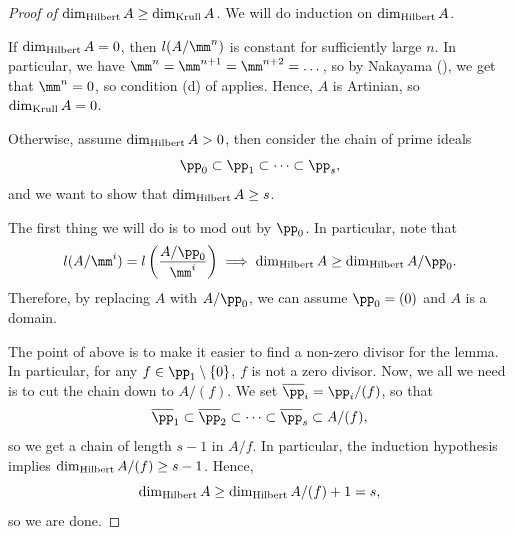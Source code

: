 \begin{proof}[Proof of $\dim_{\text{Hilbert}} A\geq \dim_{\text{Krull}} A$]
    We will do induction on $\dim_{\text{Hilbert}} A$.

    If $\dim_{\text{Hilbert}} A=0$, then $l(A/\mm^n)$ is constant for
    sufficiently large $n$.
    In particular, we have $\mm^n = \mm^{n+1} = \mm^{n+2}=\dots$,
    so by Nakayama (), 
    we get that $\mm^n=0$, so
    condition (d) of  applies.
    Hence, $A$ is Artinian, so $\dim_{\text{Krull}} A=0$.

    Otherwise, assume $\dim_{\text{Hilbert}} A>0$, then consider
    the chain of prime ideals
    $$\pp_0\subset\pp_1\subset\dots\subset\pp_s,$$
    and we want to show that $\dim_{\text{Hilbert}} A\geq s$.

    The first thing we will do is to mod out by $\pp_0$.
    In particular, note that
    $$l(A/\mm^i) = l\left(\frac{A/\pp_0}{\mm^i}\right)
    \implies \dimH A \geq \dimH A/\pp_0.$$
    Therefore, by replacing $A$ with $A/\pp_0$,
    we can assume $\pp_0 = (0)$ and $A$ is a domain.

    The point of above is to make it easier
    to find a non-zero divisor for the lemma.
    In particular, for any $f\in\pp_1\setminus\{0\}$,
    $f$ is not a zero divisor.
    Now, we all we need is to cut the chain down to $A/(f)$.
    We set $\overline\pp_i = \pp_i/(f)$, so that
    $$\overline\pp_1\subset\overline\pp_2\subset\dots
    \subset \overline\pp_s \subset A/(f),$$
    so we get a chain of length $s-1$ in $A/f$.
    In particular, the induction hypothesis implies
    $\dim_{\text{Hilbert}} A/(f)\geq s-1$. Hence,
    $$\dim_{\text{Hilbert}}  A \geq \dim_{\text{Hilbert}} A/(f) + 1 = s,$$
    so we are done.
\end{proof}
